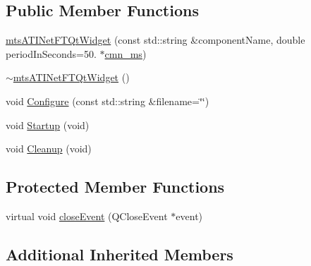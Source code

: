 \subsection*{Public Member Functions}
\begin{DoxyCompactItemize}
\item 
\hyperlink{classmts_a_t_i_net_f_t_qt_widget_a5db3fbe9d9bb69f4ff1bf6a620c00111}{mts\-A\-T\-I\-Net\-F\-T\-Qt\-Widget} (const std\-::string \&component\-Name, double period\-In\-Seconds=50. $\ast$\hyperlink{cmn_units_8h_aaf4d3f2fafb9b4a95606544b9d876b4a}{cmn\-\_\-ms})
\item 
\hyperlink{classmts_a_t_i_net_f_t_qt_widget_a2512426b8cffaddd6c6da2bf2a700009}{$\sim$mts\-A\-T\-I\-Net\-F\-T\-Qt\-Widget} ()
\item 
void \hyperlink{classmts_a_t_i_net_f_t_qt_widget_aa74bc4c4639cbd6b0501e477797b5126}{Configure} (const std\-::string \&filename=\char`\"{}\char`\"{})
\item 
void \hyperlink{classmts_a_t_i_net_f_t_qt_widget_ab0582d7c618fd885f3c32af1ec5149cd}{Startup} (void)
\item 
void \hyperlink{classmts_a_t_i_net_f_t_qt_widget_a784f1f913b70cf5211305b8b703e07ea}{Cleanup} (void)
\end{DoxyCompactItemize}
\subsection*{Protected Member Functions}
\begin{DoxyCompactItemize}
\item 
virtual void \hyperlink{classmts_a_t_i_net_f_t_qt_widget_a6bb14f11745ba121273aadcc7ab245c4}{close\-Event} (Q\-Close\-Event $\ast$event)
\end{DoxyCompactItemize}
\subsection*{Additional Inherited Members}


